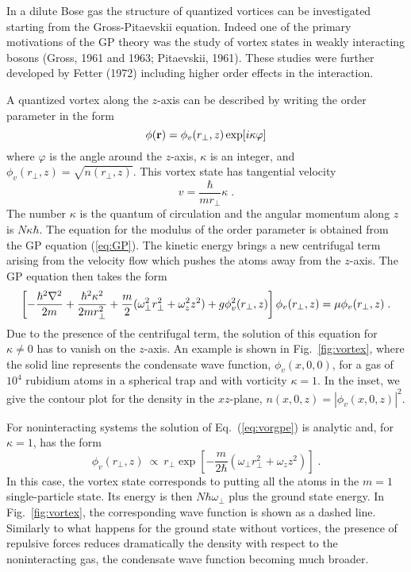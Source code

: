 In a dilute Bose gas the  structure of  quantized  vortices can be
investigated  starting from the Gross-Pitaevskii equation. Indeed one of
the primary motivations of the GP theory was the study of vortex states
in weakly interacting bosons (Gross, 1961 and 1963; Pitaevskii, 1961). 
These studies were further developed by Fetter (1972)  including higher
order effects in the interaction.

A quantized vortex along the $z$-axis can be described by writing the
order parameter in the form
\begin{equation}
\phi({\bf r})=\phi_v(r_\perp,z) \exp[i\kappa \varphi]
\label{eq:vortex}
\end{equation}
where $\varphi$ is the angle around the $z$-axis, $\kappa$ is an integer,
and $\phi_v(r_\perp,z)=\sqrt{n(r_\perp,z)}$.  This vortex state has
tangential velocity
\begin{equation}
v = \frac{\hbar}{mr_{\perp}}\kappa \; .
\label{eq:vorvel}
\end{equation}
The number $\kappa$ is the quantum of circulation and the angular momentum
along $z$ is $N\kappa\hbar$. The equation for the modulus  of the order
parameter is obtained from the GP equation (\ref{eq:GP}).  The kinetic
energy brings a new centrifugal term arising from the velocity flow which
pushes the atoms away from the $z$-axis. 
The GP equation then takes the form
\begin{equation}
\left[ - {\hbar^2 \nabla^2 \over 2m}  + { \hbar^2\kappa^2
\over 2m r_{\perp}^2} + {m \over 2} (\omega_{\perp}^2 r_{\perp}^2
+ \omega_z^2  z^2  ) +  g \phi^2_v(r_\perp,z) \right] \phi_v(r_\perp,z)
= \mu \phi_v(r_\perp,z) \;.
\label{eq:vorgpe}
\end{equation}
Due to the presence of the centrifugal term, the solution of this equation
for $\kappa\ne 0$ has to vanish on the $z$-axis. An example is shown in 
Fig.~\ref{fig:vortex}, where the solid line represents the condensate wave
function, $\phi_v(x,0,0)$, for a gas of $10^4$ rubidium atoms in a spherical 
trap and with vorticity $\kappa=1$. In the inset, we give the contour plot 
for the density in the $xz$-plane, $n(x,0,z)=|\phi_v(x,0,z)|^2$. 

For noninteracting systems the solution of Eq.~(\ref{eq:vorgpe}) is
analytic and, for $\kappa=1$, has the form
\begin{equation}
\phi_v(r_\perp,z) \ \propto \  r_{\perp} \exp\left[-\frac{m}{2\hbar}\left(
\omega_{\perp}r_{\perp}^2 + \omega_z z^2 \right)\right] \; .
\label{eq:vorsol}
\end{equation}
In this case, the vortex state corresponds to putting all the atoms  in
the $m=1$ single-particle state. Its energy is then $N 
\hbar\omega_{\perp}$ plus the ground state energy. In Fig.~\ref{fig:vortex},
the corresponding wave function is shown as a dashed line. Similarly to what 
happens for the ground state without vortices,  the presence of repulsive 
forces reduces dramatically the density with respect to the
noninteracting gas, the condensate wave function becoming much broader. 

